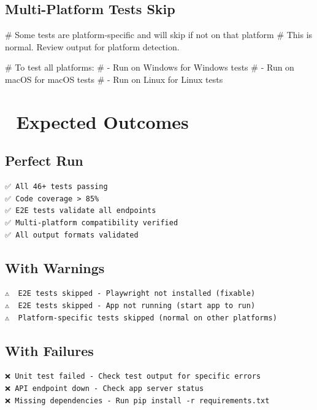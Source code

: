 \documentclass[
  11pt,
  oneside,
  openany]{scrbook}
\newenvironment{Shaded}{\begin{snugshade}}{\end{snugshade}}
\newcommand{\CommentTok}[1]{\textcolor[rgb]{0.37,0.37,0.37}{#1}}
\begin{document}
\subsection{Multi-Platform Tests Skip}\label{multi-platform-tests-skip}

\begin{Shaded}
\begin{Highlighting}[]
\CommentTok{\# Some tests are platform{-}specific and will skip if not on that platform}
\CommentTok{\# This is normal. Review output for platform detection.}

\CommentTok{\# To test all platforms:}
\CommentTok{\# {-} Run on Windows for Windows tests}
\CommentTok{\# {-} Run on macOS for macOS tests  }
\CommentTok{\# {-} Run on Linux for Linux tests}
\end{Highlighting}
\end{Shaded}

\section{🎯 Expected Outcomes}\label{expected-outcomes}

\subsection{Perfect Run}\label{perfect-run}

\begin{verbatim}
✅ All 46+ tests passing
✅ Code coverage > 85%
✅ E2E tests validate all endpoints
✅ Multi-platform compatibility verified
✅ All output formats validated
\end{verbatim}

\subsection{With Warnings}\label{with-warnings}

\begin{verbatim}
⚠️  E2E tests skipped - Playwright not installed (fixable)
⚠️  E2E tests skipped - App not running (start app to run)
⚠️  Platform-specific tests skipped (normal on other platforms)
\end{verbatim}

\subsection{With Failures}\label{with-failures}

\begin{verbatim}
❌ Unit test failed - Check test output for specific errors
❌ API endpoint down - Check app server status
❌ Missing dependencies - Run pip install -r requirements.txt
\end{verbatim}
\end{document}
